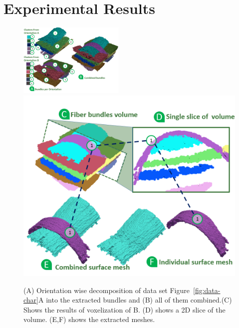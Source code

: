 \section {Experimental Results}
\label {sec:results}
%	
\begin{figure}[t]
\centering
	\includegraphics[width=0.45\textwidth]{imagesMT2014/crop-16/bundles}~ 
	\includegraphics[height=0.35\textwidth]{imagesMT2014/crop-16/vol_mesh.png} 
	\caption{(A) Orientation wise decomposition of data set Figure~\ref{fig:data-char}A into the extracted bundles and (B) all of them combined.(C) Shows the results of voxelization of B. (D) shows a 2D slice of the volume. (E,F) shows the extracted meshes.}
	\label{fig:crop-16-decomp}
\end{figure}
